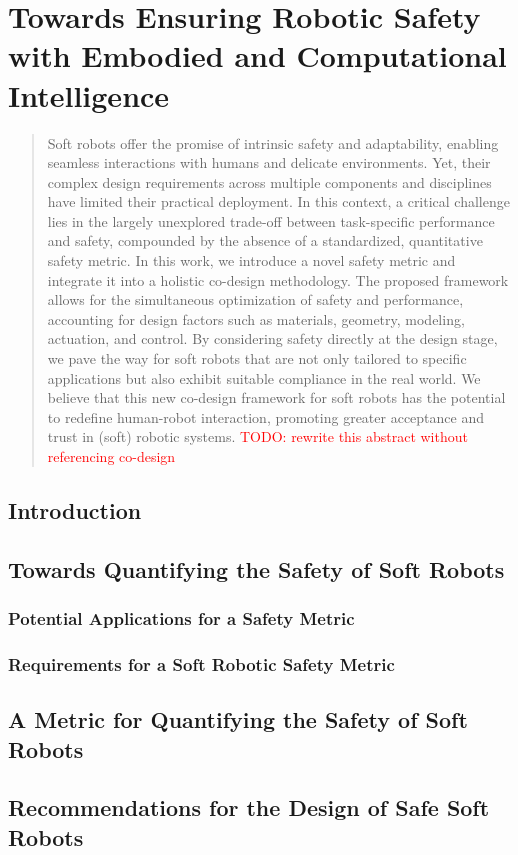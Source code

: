 \chapter{Towards Ensuring Robotic Safety with Embodied and Computational Intelligence}
\label{chp:safetymetric}

\begin{abstract}
    Soft robots offer the promise of intrinsic safety and adaptability, enabling seamless interactions with humans and delicate environments.
    Yet, their complex design requirements across multiple components and disciplines have limited their practical deployment.
    In this context, a critical challenge lies in the largely unexplored trade-off between task-specific performance and safety, compounded by the absence of a standardized, quantitative safety metric.
    In this work, we introduce a novel safety metric and integrate it into a holistic co-design methodology.
    The proposed framework allows for the simultaneous optimization of safety and performance, accounting for design factors such as materials, geometry, modeling, actuation, and control.
    By considering safety directly at the design stage, we pave the way for soft robots that are not only tailored to specific applications but also exhibit suitable compliance in the real world.
    We believe that this new co-design framework for soft robots has the potential to redefine human-robot interaction, promoting greater acceptance and trust in (soft) robotic systems.
    \textcolor{red}{TODO: rewrite this abstract without referencing co-design}
\end{abstract}


\newpage

\section{Introduction}
\section{Towards Quantifying the Safety of Soft Robots}
\subsection{Potential Applications for a Safety Metric}
\subsection{Requirements for a Soft Robotic Safety Metric}
\section{A Metric for Quantifying the Safety of Soft Robots}
\section{Recommendations for the Design of Safe Soft Robots}
